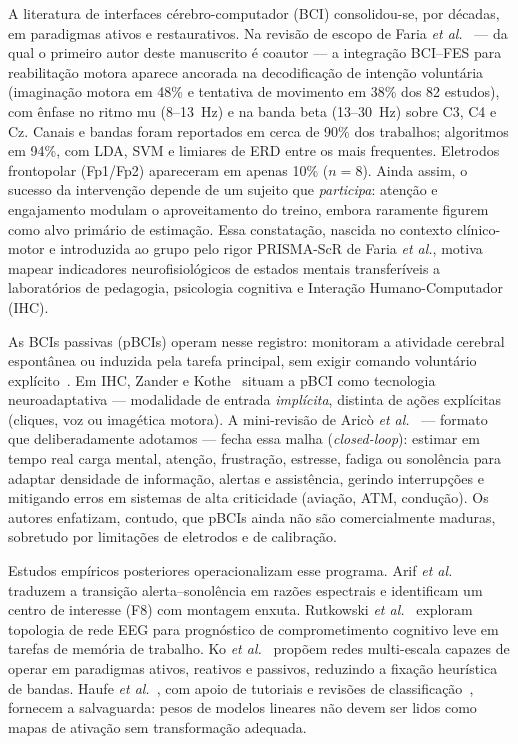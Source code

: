 \documentclass[12pt]{article}
\begin{document}
A literatura de interfaces c\'{e}rebro-computador (BCI) consolidou-se, por d\'{e}cadas, em paradigmas ativos e restaurativos. Na revis\~{a}o de escopo de Faria \textit{et al.}~\cite{Faria2026} --- da qual o primeiro autor deste manuscrito \'{e} coautor --- a integra\c{c}\~{a}o BCI--FES para reabilita\c{c}\~{a}o motora aparece ancorada na decodifica\c{c}\~{a}o de inten\c{c}\~{a}o volunt\'{a}ria (imagina\c{c}\~{a}o motora em 48\% e tentativa de movimento em 38\% dos 82 estudos), com \^{e}nfase no ritmo mu (8--13~Hz) e na banda beta (13--30~Hz) sobre C3, C4 e Cz. Canais e bandas foram reportados em cerca de 90\% dos trabalhos; algoritmos em 94\%, com LDA, SVM e limiares de ERD entre os mais frequentes. Eletrodos frontopolar (Fp1/Fp2) apareceram em apenas 10\% ($n=8$). Ainda assim, o sucesso da interven\c{c}\~{a}o depende de um sujeito que \textit{participa}: aten\c{c}\~{a}o e engajamento modulam o aproveitamento do treino, embora raramente figurem como alvo prim\'{a}rio de estima\c{c}\~{a}o. Essa constata\c{c}\~{a}o, nascida no contexto cl\'{i}nico-motor e introduzida ao grupo pelo rigor PRISMA-ScR de Faria \textit{et al.}, motiva mapear indicadores neurofisiol\'{o}gicos de estados mentais transfer\'{i}veis a laborat\'{o}rios de pedagogia, psicologia cognitiva e Intera\c{c}\~{a}o Humano-Computador (IHC).

As BCIs passivas (pBCIs) operam nesse registro: monitoram a atividade cerebral espont\^{a}nea ou induzida pela tarefa principal, sem exigir comando volunt\'{a}rio expl\'{i}cito~\cite{Arico2017,Zander2016}. Em IHC, Zander e Kothe~\cite{Zander2016} situam a pBCI como tecnologia neuroadaptativa --- modalidade de entrada \textit{impl\'{i}cita}, distinta de a\c{c}\~{o}es expl\'{i}citas (cliques, voz ou imag\'{e}tica motora). A mini-revis\~{a}o de Aric\`{o} \textit{et al.}~\cite{Arico2017} --- formato que deliberadamente adotamos --- fecha essa malha (\textit{closed-loop}): estimar em tempo real carga mental, aten\c{c}\~{a}o, frustra\c{c}\~{a}o, estresse, fadiga ou sonol\^{e}ncia para adaptar densidade de informa\c{c}\~{a}o, alertas e assist\^{e}ncia, gerindo interrup\c{c}\~{o}es e mitigando erros em sistemas de alta criticidade (avia\c{c}\~{a}o, ATM, condu\c{c}\~{a}o). Os autores enfatizam, contudo, que pBCIs ainda n\~{a}o s\~{a}o comercialmente maduras, sobretudo por limita\c{c}\~{o}es de eletrodos e de calibra\c{c}\~{a}o.

Estudos emp\'{i}ricos posteriores operacionalizam esse programa. Arif \textit{et al.}~\cite{Arif2023} traduzem a transi\c{c}\~{a}o alerta--sonol\^{e}ncia em raz\~{o}es espectrais e identificam um centro de interesse (F8) com montagem enxuta. Rutkowski \textit{et al.}~\cite{Rutkowski2023} exploram topologia de rede EEG para progn\'{o}stico de comprometimento cognitivo leve em tarefas de mem\'{o}ria de trabalho. Ko \textit{et al.}~\cite{Ko2021} prop\~{o}em redes multi-escala capazes de operar em paradigmas ativos, reativos e passivos, reduzindo a fixa\c{c}\~{a}o heur\'{i}stica de bandas. Haufe \textit{et al.}~\cite{Haufe2014}, com apoio de tutoriais e revis\~{o}es de classifica\c{c}\~{a}o~\cite{Blankertz2011,Lotte2018}, fornecem a salvaguarda: pesos de modelos lineares n\~{a}o devem ser lidos como mapas de ativa\c{c}\~{a}o sem transforma\c{c}\~{a}o adequada.
\end{document}

